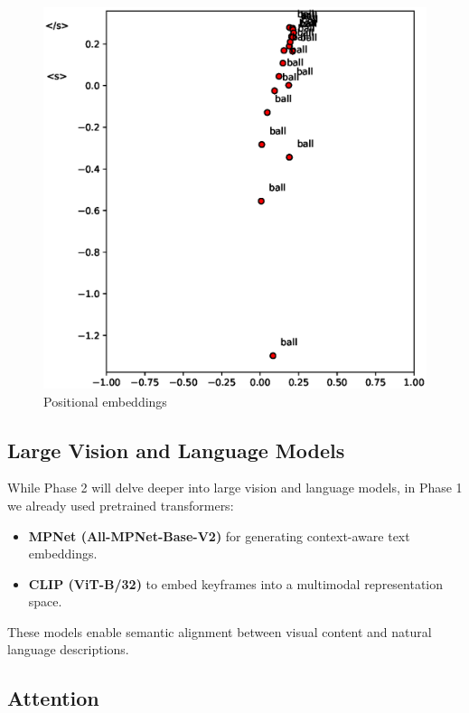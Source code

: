 \documentclass[runningheads]{llncs}
\begin{document}
\begin{figure}
  \centering
  \includegraphics[width=.5\textwidth, clip=true, trim = 15mm 0mm 0mm 0mm]{pos_embeds.eps}
  \caption{Positional embeddings} \label{pos_embeds}
  \label{img:positional_embeddings}
\end{figure}

\subsection{Large Vision and Language Models}
While Phase 2 will delve deeper into large vision and language models, in Phase 1 we already used pretrained transformers:

\begin{itemize}
    \item \textbf{MPNet (All-MPNet-Base-V2)} for generating context-aware text embeddings.
    \item \textbf{CLIP (ViT-B/32)} to embed keyframes into a multimodal representation space.
\end{itemize}

These models enable semantic alignment between visual content and natural language descriptions.

\subsection{Attention}
\end{document}
